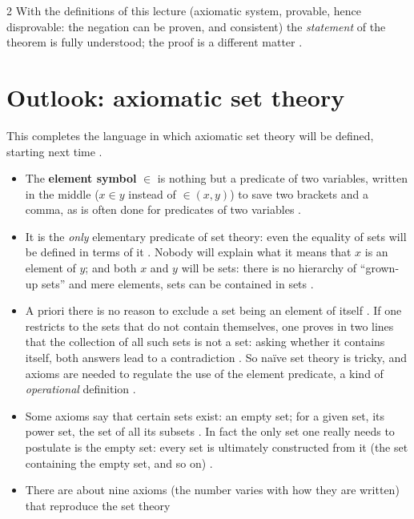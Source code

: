 \begin{paracol}{2}
With the definitions of this lecture (axiomatic system, provable, hence disprovable: the negation can be proven,
and consistent) the \emph{statement} of the theorem is fully understood; the proof is a different matter
.

\section{Outlook: axiomatic set theory}\label{sec:lo-outlook}

This completes the language in which axiomatic set theory will be defined, starting next time
.
\begin{itemize}
  \item The \textbf{element symbol} $\in$ is nothing but a predicate of two variables, written in the middle
        ($x\in y$ instead of ${\in}(x,y)$) to save two brackets and a comma, as is often done for predicates of
        two variables .
  \item It is the \emph{only} elementary predicate of set theory: even the equality of sets will be defined in
        terms of it . Nobody will explain what it means that $x$ is an element of $y$; and both
        $x$ and $y$ will be sets: there is no hierarchy of ``grown-up sets'' and mere elements, sets can be
        contained in sets .
  \item A priori there is no reason to exclude a set being an element of itself . If one
        restricts to the sets that do not contain themselves, one proves in two lines that the collection of
        all such sets is not a set: asking whether it contains itself, both answers lead to a contradiction
        . So na\"ive set theory is tricky, and axioms are needed to regulate the
        use of the element predicate, a kind of \emph{operational} definition .
  \item Some axioms say that certain sets exist: an empty set; for a given set, its power set, the set of all its
        subsets . In fact the only set one really needs to postulate is the empty set: every set
        is ultimately constructed from it (the set containing the empty set, and so on) .
  \item There are about nine axioms (the number varies with how they are written) that reproduce the set theory

\end{itemize}
\end{paracol}

